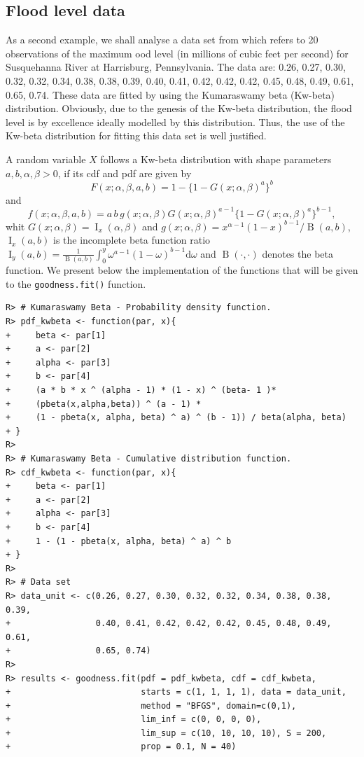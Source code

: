 \documentclass[10pt,letterpaper]{article}
\begin{document}
{\color{red}
\subsection{Flood level data}
As a second example, we shall analyse a data set from \cite{Dumonceaux73} which refers to 20 observations of
the maximum ood level (in millions of cubic feet per second) for Susquehanna River
at Harrisburg, Pennsylvania. The data are: 0.26, 0.27, 0.30, 0.32, 0.32, 0.34, 0.38, 0.38, 0.39, 0.40, 0.41, 0.42, 0.42, 0.42, 0.45,
0.48, 0.49, 0.61, 0.65, 0.74. These data are fitted by using the Kumaraswamy beta (Kw-beta) distribution.
Obviously, due to the genesis of the Kw-beta distribution, the flood level is by excellence ideally modelled by
this distribution. Thus, the use of the Kw-beta distribution for fitting this data set is well justified.

A random variable $X$ follows a Kw-beta distribution with shape
parameters $a, b, \alpha, \beta > 0$, if its cdf and pdf are given by
%
$$
F(x; \alpha, \beta, a, b) = 1-\{1-G(x; \alpha, \beta)^{a}\}^{b}$$
and
$$
f(x; \alpha, \beta, a, b) = a\,b\,g(x;\alpha, \beta)G(x;\alpha, \beta)^{a-1}\{1-G(x;\alpha, \beta)^{a}\}^{b-1},
$$
%
whit $G(x; \alpha,\beta)=\operatorname{I}_{x}(\alpha,\beta)$ and $g(x;\alpha,\beta) = x^{\alpha-1}(1-x)^{b-1}/\operatorname{B}(a,b)$,
$\operatorname{I}_{x}(a,b)$ is the incomplete beta function ratio
$\operatorname{I}_{y}(a,b) = \frac{1}{\operatorname{B}(a,b)}
\int^{y}_{0} \omega^{a-1}(1-\omega)^{b-1}\mathrm{d}\omega$
and $\operatorname{B}(\cdot,\cdot)$ denotes the beta function.
We present below the implementation of the functions that will be given to the \texttt{goodness.fit()} function.

\begin{verbatim}
R> # Kumaraswamy Beta - Probability density function.
R> pdf_kwbeta <- function(par, x){
+     beta <- par[1]
+     a <- par[2]
+     alpha <- par[3]
+     b <- par[4]
+     (a * b * x ^ (alpha - 1) * (1 - x) ^ (beta- 1 )*
+     (pbeta(x,alpha,beta)) ^ (a - 1) * 
+     (1 - pbeta(x, alpha, beta) ^ a) ^ (b - 1)) / beta(alpha, beta)
+ }
R>
R> # Kumaraswamy Beta - Cumulative distribution function.
R> cdf_kwbeta <- function(par, x){
+     beta <- par[1]
+     a <- par[2]
+     alpha <- par[3]
+     b <- par[4]
+     1 - (1 - pbeta(x, alpha, beta) ^ a) ^ b
+ }
R>
R> # Data set
R> data_unit <- c(0.26, 0.27, 0.30, 0.32, 0.32, 0.34, 0.38, 0.38, 0.39,
+                 0.40, 0.41, 0.42, 0.42, 0.42, 0.45, 0.48, 0.49, 0.61,
+                 0.65, 0.74)
R>
R> results <- goodness.fit(pdf = pdf_kwbeta, cdf = cdf_kwbeta, 
+                          starts = c(1, 1, 1, 1), data = data_unit,
+                          method = "BFGS", domain=c(0,1),
+                          lim_inf = c(0, 0, 0, 0), 
+                          lim_sup = c(10, 10, 10, 10), S = 200, 
+                          prop = 0.1, N = 40)


\end{verbatim}}
\end{document}
